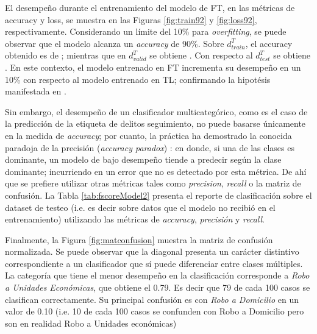 \documentclass[onecolumn, journal, english, 12pt, a4paper]{IEEEtran} %
\theoremstyle{definition}
\begin{document}
El desempeño durante el entrenamiento del modelo de FT, en las
métricas de accuracy y loss,  se muestra en las Figuras
\ref{fig:train92} y  \ref{fig:loss92}, respectivamente. Considerando
un límite del 10\% para \emph{overfitting}, se puede observar que el
modelo alcanza un \emph{accuracy} de 90\%. Sobre $d_{train}^T$, el
accuracy obtenido es de ; mientras que en
$d_{valid}^T$ se obtiene . Con respecto al
$d_{test}^T$ se obtiene . En este contexto, el modelo
entrenado en FT incrementa su desempeño en un 10\% con respecto al
modelo entrenado en TL; confirmando la hipotésis manifestada en
\textcite{tunstall2022natural}.

Sin embargo, el desempeño de un clasificador multicategórico, como es
el caso de la predicción de la etiqueta de delitos seguimiento, no
puede basarse únicamente en la medida de \emph{accuracy}; por cuanto,
la práctica ha demostrado la conocida paradoja de la precisión
(\emph{accuracy paradox}) \parencite{accuracyParadoxWikipedia2022}: en
donde, si una de las clases es dominante, un modelo de bajo desempeño
tiende a predecir según la clase dominante; incurriendo en un error
que no es detectado por esta métrica. De ahí que se prefiere utilizar
otras métricas tales como \emph{precision}, \emph{recall} o la matriz
de confusión. La Tabla \ref{tab:fscoreModel2} presenta el reporte de
clasificación sobre el dataset de testeo (i.e. es decir sobre datos
que el modelo no recibió en el entrenamiento) utilizando las métricas
de \emph{accuracy}, \emph{precisión} y \emph{recall}.

Finalmente, la Figura \ref{fig:matconfusion} muestra la matriz de
confusión normalizada. Se puede observar que la diagonal presenta un
carácter distintivo correspondiente a un clasificador que sí puede
diferenciar entre clases múltiples. La categoría que tiene el menor
desempeño en la clasificación corresponde a \emph{Robo a Unidades
  Económicas}, que obtiene el 0.79. Es decir que 79 de cada 100 casos
se clasifican correctamente. Su principal confusión es con \emph{Robo
  a Domicilio} en un valor de 0.10 (i.e. 10 de cada 100 casos se
confunden con Robo a Domicilio pero son en realidad Robo a Unidades
económicas)
\end{document}
